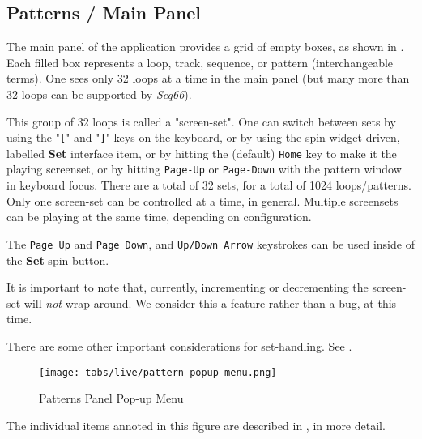 \subsection{Patterns / Main Panel}
\label{subsec:patterns_panel_main}

   The main panel of the application provides a grid of empty boxes,
   as shown in
   .
   Each filled box represents a loop, track, sequence, or pattern
   (interchangeable terms).
   One sees only 32 loops at a time in the main panel (but many more than
   32 loops can be supported by \textsl{Seq66}).

   This group of 32 loops is called a "screen-set".
   One can switch between sets by using the
   \index{keys![}
   "\texttt{[}" and
   \index{keys!]}
   "\texttt{]}" keys on the keyboard, or by using
   the spin-widget-driven, labelled \textbf{Set} interface item, or
   by hitting the (default) \texttt{Home} key to make it the playing screenset,
   or by hitting \texttt{Page-Up} or \texttt{Page-Down} with the pattern window
   in keyboard focus.
   There are a total of 32 sets, for a total of 1024 loops/patterns. 
   Only one screen-set can be controlled at a time, in general.
   Multiple screensets can be playing at the same time, depending on
   configuration.

   The \texttt{Page Up} and \texttt{Page Down}, and \texttt{Up/Down Arrow}
   keystrokes can be used inside of the \textbf{Set} spin-button.

   It is important to note that, currently, incrementing or decrementing
   the screen-set will \textsl{not} wrap-around.
   We consider this a feature rather than a bug, at this time.

   There are some other important considerations for set-handling.
   See .

\begin{figure}[H]
   \centering 
   \texttt{[image: tabs/live/pattern-popup-menu.png]}
   \caption{Patterns Panel Pop-up Menu}
   \label{fig:patterns_panel_popup_menu}
\end{figure}

   The individual items annoted in this figure are described in
   , in more detail.

